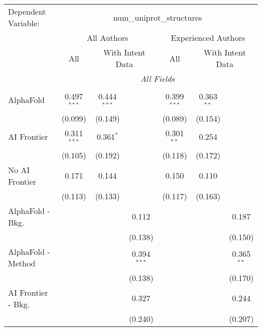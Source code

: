 \begingroup
\centering
\begin{tabular}{lcccccc}
   \tabularnewline \midrule \midrule
   Dependent Variable: & \multicolumn{6}{c}{num\_uniprot\_structures}\\
 & \multicolumn{3}{c}{All Authors} & \multicolumn{3}{c}{Experienced Authors} \\
\cmidrule(lr){2-4} \cmidrule(lr){5-7}
 & \multicolumn{1}{c}{All} & \multicolumn{2}{c}{With Intent Data} & \multicolumn{1}{c}{All} & \multicolumn{2}{c}{With Intent Data} \\
\cmidrule(lr){2-2} \cmidrule(lr){3-4} \cmidrule(lr){5-5} \cmidrule(lr){6-7}
 & \multicolumn{6}{c}{\textit{All Fields}} \\ \\
   AlphaFold               & 0.497$^{***}$ & 0.444$^{***}$ &               & 0.399$^{***}$ & 0.363$^{**}$ &   \\   
                           & (0.099)       & (0.149)       &               & (0.089)       & (0.154)      &   \\   
   AI Frontier             & 0.311$^{***}$ & 0.361$^{*}$   &               & 0.301$^{**}$  & 0.254        &   \\   
                           & (0.105)       & (0.192)       &               & (0.118)       & (0.172)      &   \\   
   No AI Frontier          & 0.171         & 0.144         &               & 0.150         & 0.110        &   \\   
                           & (0.113)       & (0.133)       &               & (0.117)       & (0.163)      &   \\   
   AlphaFold - Bkg.        &               &               & 0.112         &               &              & 0.187\\   
                           &               &               & (0.138)       &               &              & (0.150)\\   
   AlphaFold - Method      &               &               & 0.394$^{***}$ &               &              & 0.365$^{**}$\\   
                           &               &               & (0.138)       &               &              & (0.170)\\   
   AI Frontier - Bkg.      &               &               & 0.327         &               &              & 0.244\\   
                           &               &               & (0.240)       &               &              & (0.207)\\   

\end{tabular}
